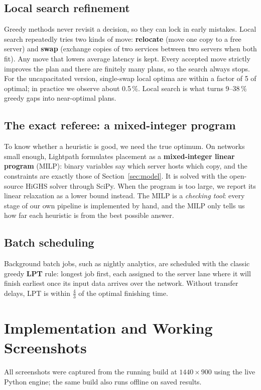 \subsection{Local search refinement}
Greedy methods never revisit a decision, so they can lock in early mistakes. Local search repeatedly tries two kinds of move: \textbf{relocate} (move one copy to a free server) and \textbf{swap} (exchange copies of two services between two servers when both fit). Any move that lowers average latency is kept. Every accepted move strictly improves the plan and there are finitely many plans, so the search always stops. For the uncapacitated version, single-swap local optima are within a factor of 5 of optimal; in practice we observe about 0.5\,\%. Local search is what turns 9--38\,\% greedy gaps into near-optimal plans.

\subsection{The exact referee: a mixed-integer program}
To know whether a heuristic is good, we need the true optimum. On networks small enough, Lightpath formulates placement as a \textbf{mixed-integer linear program} (MILP): binary variables say which server hosts which copy, and the constraints are exactly those of Section~\ref{sec:model}. It is solved with the open-source HiGHS solver \cite{huangfu2018} through SciPy. When the program is too large, we report its linear relaxation as a lower bound instead. The MILP is a \emph{checking tool}: every stage of our own pipeline is implemented by hand, and the MILP only tells us how far each heuristic is from the best possible answer.

\subsection{Batch scheduling}
Background batch jobs, such as nightly analytics, are scheduled with the classic greedy \textbf{LPT} rule: longest job first, each assigned to the server lane where it will finish earliest once its input data arrives over the network. Without transfer delays, LPT is within $\tfrac43$ of the optimal finishing time.



\section{Implementation and Working Screenshots}\label{sec:impl}
All screenshots were captured from the running build at $1440\times900$ using the live Python engine; the same build also runs offline on saved results.

